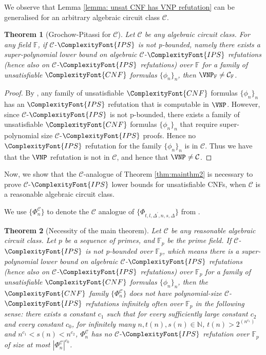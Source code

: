\documentclass[11pt,letter]{article}
\newtheorem{theorem}{Theorem}[section]
\theoremstyle{remark} %
\newcommand{\IPS}{%
    {
        \ComplexityFont{IPS} 
    }
}
\newcommand{\CNF}{ %
    {
        \ComplexityFont{CNF}
    }
}
\newcommand{\F}{\mathbb{F}}
\begin{document}
{We observe that Lemma \ref{lemma: unsat CNF has VNP refutation} can be generalised for an arbitrary algebraic circuit class $\mathcal{C}$.

\begin{theorem}[Grochow-Pitassi for $\mathcal{C}$]
    \label{theorem: grochow-pitassi for C}
    Let $\mathcal{C}$ be any algebraic circuit class. For any field $\mathbb{F}$, if $\mathcal{C}$-$\IPS$ is not p-bounded, namely there exists a super-polynomial lower bound on algebraic $\mathcal{C}$-$\IPS$ refutations (hence also on $\mathcal{C}$-$\IPS$ refutations) over $\mathbb{F}$ for a family of unsatisfiable $\CNF$ formulas $\{\phi_n\}_n$, then $\VNP_\mathbb{F} \neq \mathcal{C}_\mathbb{F}$.
\end{theorem}

\begin{proof}
    By , any family of unsatisfiable $\CNF$ formulas $\{\phi_n\}_n$ has an $\IPS$ refutation that is computable in $\VNP$. However, since $\mathcal{C}$-$\IPS$ is not p-bounded, there exists a family of unsatisfiable $\CNF$ formulas $\{\phi_n\}_n$ that require super-polynomial size $\mathcal{C}$-$\IPS$ proofs. Hence no $\IPS$ refutation for the family $\{\phi_n\}_n$ is in $\mathcal{C}$. Thus we have that the $\VNP$ refutation is not in $\mathcal{C}$, and hence that $\VNP \neq \mathcal{C}$.
\end{proof}

Now, we show that the $\mathcal{C}$-analogue of  Theorem \ref{thm:mainthm2} is necessary to prove $\mathcal{C}$-$\IPS$ lower bounds for unsatisfiable CNFs, when $\mathcal{C}$ is a reasonable algebraic circuit class.  


    We use $\{\Phi^\mathcal{C}_n\}$ to denote the $\mathcal{C}$ analogue of $\{\Phi_{t,l,\Delta^\prime,n,s,\Delta}\}$ from .

    
    \begin{theorem}[Necessity of the main theorem]
        \label{theorem: necessity}
        Let $\mathcal{C}$ be any reasonable algebraic circuit class. Let $p$ be a sequence of primes, and $\mathbb{F}_p$ be the prime field. If $\mathcal{C}$-$\IPS$ is not p-bounded over $\F_p$, which means there is a super-polynomial lower bound on algebraic $\mathcal{C}$-$\IPS$ refutations (hence also on $\mathcal{C}$-$\IPS$ refutations) over $\mathbb{F}_{p}$ for a family of unsatisfiable $\CNF$ formulas $\{\phi_n\}_n$, then the $\CNF$ family $\{\Phi^\mathcal{C}_n\}$ does not have polynomial-size $\mathcal{C}$-$\IPS$ refutations infinitely often over $\mathbb{F}_{p}$ in the following sense: 
        there exists a constant $c_1$ such that for every sufficiently large constant $c_2$ and every constant $c_0$, for infinitely many $n, t(n), s(n) \in \mathbb{N}$, $t(n) > 2^{(n^{c_1})}$ and $n^{c_1} < s(n) < n^{c_2}$, $\Phi^\mathcal{C}_n$ has no $\mathcal{C}$-$\IPS$ refutation over $\mathbb{F}_{p}$ of size at most $|\Phi^\mathcal{C}_n|^{c_0}$.
    \end{theorem}

}
\end{document}
